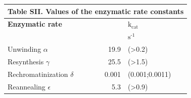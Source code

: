 \begin{table}[H]
	
	\tiny
	\begin{tabular}{lrl}
		
		\multicolumn{3}{l}{Table SII. \textbf{Values of the enzymatic rate constants}} \\
		\hline
		\textbf{Enzymatic rate}    && \textbf{$\text{k}_{\text{cat}}$}  \\
		\hline
		&  &$\text{s}^{\text{-1}}$       \\
		Unwinding  $\alpha$                                     & 19.9& (>0.2)                 \\
		Resynthesis $\gamma$                                 & 25.5 &(>1.5)     \\
		Rechromatinization $\delta$                         & 0.001 &(0.001;0.0011)                   \\
		Reannealing  $\epsilon$                                & 5.3&(>0.9)    \\
		\hline
	\end{tabular}
	\label{tab:parameter_catalyticRates}
\end{table}
